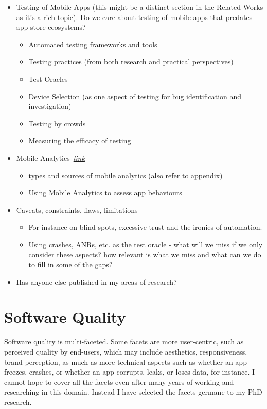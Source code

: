 \begin{itemize}
\begin{itemize}
    \end{itemize}
    \item Testing of Mobile Apps (this might be a distinct section in the Related Works as it's a rich topic). Do we care about testing of mobile apps that predates app store ecosystems?
    \begin{itemize}
        \item Automated testing frameworks and tools
        \item Testing practices (from both research and practical perspectives)
        \item Test Oracles
        \item Device Selection (as one aspect of testing for bug identification and investigation)
        \item Testing by crowds
        \item Measuring the efficacy of testing
    \end{itemize}
    \item Mobile Analytics~\hyperlink{mobile.analytics}{\emph{link}}
    \begin{itemize}
        \item types and sources of mobile analytics (also refer to appendix)
        \item Using Mobile Analytics to assess app behaviours
    \end{itemize}
    \item Caveats, constraints, flaws, limitations
    \begin{itemize}
        \item For instance on blind-spots, excessive trust and the ironies of automation. 
        \item Using crashes, ANRs, etc. as the test oracle - what will we miss if we only consider these aspects? how relevant is what we miss and what can we do to fill in some of the gaps?
    \end{itemize}
    \item Has anyone else published in my areas of research?
\end{itemize}

\hypertarget{software.quality}{}
\section{Software Quality}
Software quality is multi-faceted. Some facets are more user-centric, such as perceived quality by end-users, which may include aesthetics, responsiveness, brand perception, as much as more technical aspects such as whether an app freezes, crashes, or whether an app corrupts, leaks, or loses data, for instance. I cannot hope to %
cover all the facets even after many years of working and researching in this domain. Instead I have selected the facets germane to my PhD research.

